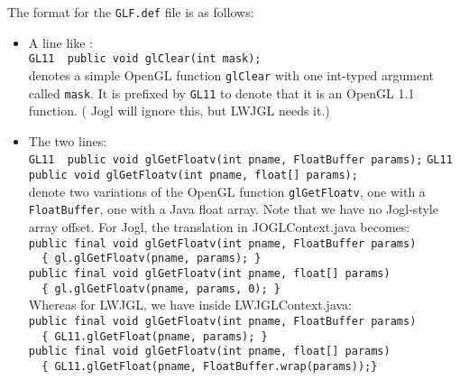  
  The format for the \verb"GLF.def" file is as follows:
  \begin{itemize}
  \item A line like :\\
  \verb"GL11  public void glClear(int mask);"\\
  denotes a simple OpenGL function \verb"glClear" with one int-typed argument called \verb"mask". 
  It is prefixed by \verb"GL11" to denote that it is an OpenGL 1.1 function. ( Jogl  will ignore this,
  but  LWJGL  needs it.)
  \item The two lines:\\
  \verb"GL11  public void glGetFloatv(int pname, FloatBuffer params);"
  \verb"GL11  public void glGetFloatv(int pname, float[] params);"\\
  denote two variations of the OpenGL function \verb"glGetFloatv", one with a \verb"FloatBuffer",
  one with a Java float array. Note that we have no Jogl-style array offset.
  For Jogl, the translation in JOGLContext.java becomes:\\
  \verb"public final void glGetFloatv(int pname, FloatBuffer params) "\\
  \verb"  { gl.glGetFloatv(pname, params); }"\\
  \verb"public final void glGetFloatv(int pname, float[] params) "\\
  \verb"  { gl.glGetFloatv(pname, params, 0); }"\\
  Whereas for LWJGL, we have inside LWJGLContext.java:\\
  \verb"public final void glGetFloatv(int pname, FloatBuffer params)  "\\
  \verb"  { GL11.glGetFloat(pname, params); }"\\
  \verb"public final void glGetFloatv(int pname, float[] params)  "\\
  \verb"  { GL11.glGetFloat(pname, FloatBuffer.wrap(params));}"\\
  

\end{itemize}
